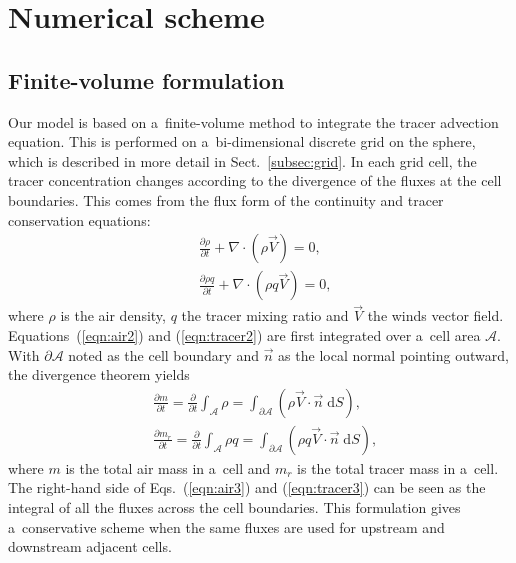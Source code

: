 \section{Numerical scheme}
\label{sec2:scheme}
   \subsection{Finite-volume formulation}

   Our model is based on a~finite-volume method to integrate the
   tracer advection equation. This is performed on a~bi-dimensional
   discrete grid on the sphere, which is described in more detail in
   Sect.~\ref{subsec:grid}. In each grid cell, the tracer
   concentration changes according to the divergence of the fluxes at
   the cell boundaries. This comes from the flux form of the
   continuity and tracer conservation equations:
   \begin{align}
     &\frac{\partial \rho}{\partial t} + \nabla \cdot (\rho \vec{V}) = 0 ,
     \label{eqn:air2}
     \\
     &\frac{\partial \rho q}{\partial t} + \nabla \cdot ( \rho q \vec{V})  = 0,
     \label{eqn:tracer2}
   \end{align}
   where $\rho$ is the air density, $q$ the tracer mixing ratio and
   $\vec{V}$ the winds vector field. Equations~(\ref{eqn:air2}) and
   (\ref{eqn:tracer2}) are first integrated over a~cell area
   $\mathcal{A}$. With $\partial\mathcal{A}$ noted as the cell boundary and
   $\vec{n}$ as the local normal pointing outward, the divergence theorem yields
   \begin{align}
     &\frac{\partial m}{\partial t}=\frac{\partial}{\partial t} {\int_{\mathcal{A}}
   \rho}
   = \int_{\partial \mathcal{A}} (\rho \vec{V}\cdot\vec{n} \;\mathrm{d}S),
   \label{eqn:air3}
   \\
   &\frac{\partial m_r}{\partial t}=\frac{\partial}{\partial t} {\int_{\mathcal{A}}
 \rho q} = \int_{\partial \mathcal{A}} (\rho q \vec{V}\cdot \vec{n} \;\mathrm{d}S),
 \label{eqn:tracer3}
     \end{align}
     where ${m}$ is the total air mass in a~cell and ${m_r}$ is the
     total tracer mass in a~cell. The right-hand side of
     Eqs.~(\ref{eqn:air3}) and (\ref{eqn:tracer3}) can be seen as the
     integral of all the fluxes across the cell boundaries. This
     formulation gives a~conservative scheme when the same fluxes are
     used for upstream and downstream adjacent cells.

